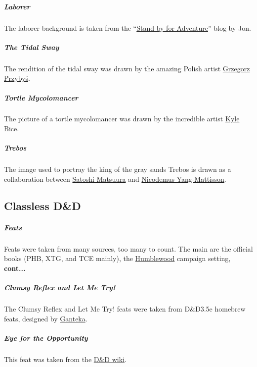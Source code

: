     \subparagraph{Laborer} The laborer background is taken from the ``\href{https://standbyforadventure.blogspot.com/2014/08/d-background-laborer.html}{Stand by for Adventure}'' blog by Jon.

    \subparagraph{The Tidal Sway} The rendition of the tidal sway was drawn by the amazing Polish artist \href{https://grzegorzprzybys.artstation.com/}{Grzegorz Przybyś}.

    \subparagraph{Tortle Mycolomancer} The picture of a tortle mycolomancer was drawn by the incredible artist \href{https://twitter.com/KyleBice}{Kyle Bice}.

    \subparagraph{Trebos} The image used to portray the king of the gray sands Trebos is drawn as a collaboration between \href{https://www.artstation.com/hiziripro}{Satoshi Matsuura} and \href{https://www.artstation.com/nicodemus}{Nicodemus Yang-Mattisson}.

\subsection*{Classless D\&D}
    \subparagraph{Feats} Feats were taken from many sources, too many to count.
    The main are the official books (PHB, XTG, and TCE mainly), the \href{https://thedeckofmany.com/collections/humblewood}{Humblewood} campaign setting, \textbf{cont...}

    \subparagraph{Clumsy Reflex and Let Me Try!} The Clumsy Reflex and Let Me Try! feats were taken from D\&D3.5e homebrew feats, designed by \href{https://www.dandwiki.com/wiki/User:Ganteka}{Ganteka}.

    \subparagraph{Eye for the Opportunity} This feat was taken from the \href{https://www.dandwiki.com/wiki/Eye_for_the_opportunity_(5e_Feat)}{D\&D wiki}.
